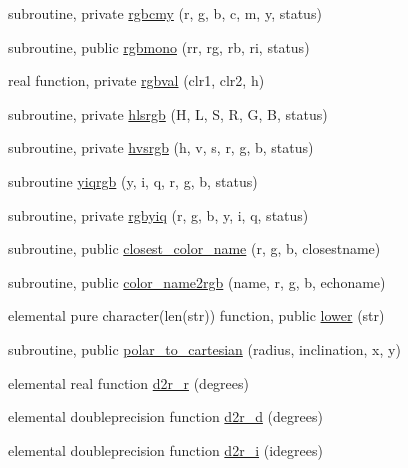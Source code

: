 \begin{DoxyCompactItemize}
\item 
subroutine, private \mbox{\hyperlink{namespacem__pixel_a4dd5383ae0616511d16c996903a971dc}{rgbcmy}} (r, g, b, c, m, y, status)
\item 
subroutine, public \mbox{\hyperlink{namespacem__pixel_a63a581cda811571c9ded805516f9d709}{rgbmono}} (rr, rg, rb, ri, status)
\item 
real function, private \mbox{\hyperlink{namespacem__pixel_a9f8175d7b5b349cd5c30a99100eef5c5}{rgbval}} (clr1, clr2, h)
\item 
subroutine, private \mbox{\hyperlink{namespacem__pixel_a854b4980c2694d7c33b2830a225eeca0}{hlsrgb}} (H, L, S, R, G, B, status)
\item 
subroutine, private \mbox{\hyperlink{namespacem__pixel_a6eda5641d5c42b51d9488bd7ea743744}{hvsrgb}} (h, v, s, r, g, b, status)
\item 
subroutine \mbox{\hyperlink{namespacem__pixel_a0f4f12a4a769b8827a79b44f333eca28}{yiqrgb}} (y, i, q, r, g, b, status)
\item 
subroutine, private \mbox{\hyperlink{namespacem__pixel_a0c025b24458dba5fb448f62cb10c7088}{rgbyiq}} (r, g, b, y, i, q, status)
\item 
subroutine, public \mbox{\hyperlink{namespacem__pixel_a8555eecec7e18106e8167e137cfe8424}{closest\+\_\+color\+\_\+name}} (r, g, b, closestname)
\item 
subroutine, public \mbox{\hyperlink{namespacem__pixel_aee26ac45961d4093d2e472fcb6e1887d}{color\+\_\+name2rgb}} (name, r, g, b, echoname)
\item 
elemental pure character(len(str)) function, public \mbox{\hyperlink{namespacem__pixel_a7b4934756a8325a19fee6653c4cbf6af}{lower}} (str)
\item 
subroutine, public \mbox{\hyperlink{namespacem__pixel_a5ee5c618d117b150b661e15517a3d408}{polar\+\_\+to\+\_\+cartesian}} (radius, inclination, x, y)
\item 
elemental real function \mbox{\hyperlink{namespacem__pixel_af1963e62c5cc06bfb042831d1c869dc1}{d2r\+\_\+r}} (degrees)
\item 
elemental doubleprecision function \mbox{\hyperlink{namespacem__pixel_a2ea42e55432274dec04fdc822e484cdb}{d2r\+\_\+d}} (degrees)
\item 
elemental doubleprecision function \mbox{\hyperlink{namespacem__pixel_a0ac7088105ca5334d0ca3f1e4ea16d65}{d2r\+\_\+i}} (idegrees)
\end{DoxyCompactItemize}
